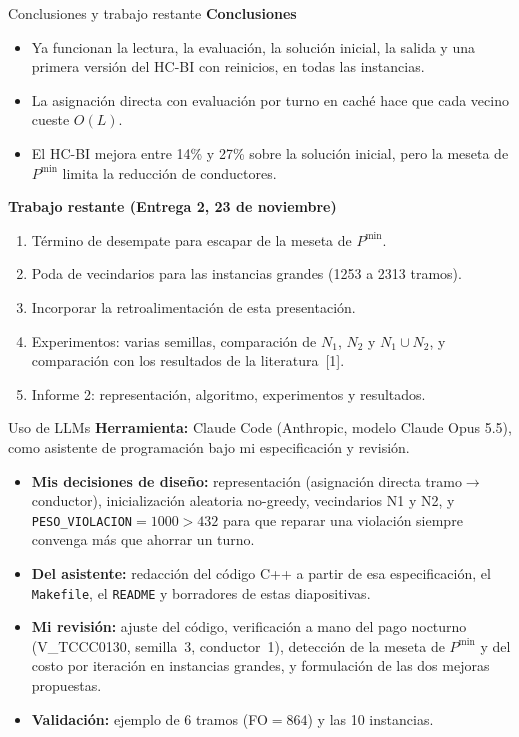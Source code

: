 \documentclass[aspectratio=169,10pt]{beamer}
\begin{document}
\begin{frame}{Conclusiones y trabajo restante}
\textbf{Conclusiones}
\begin{itemize}
\item Ya funcionan la lectura, la evaluación, la solución inicial, la salida y una primera versión del HC-BI con reinicios, en todas las instancias.
\item La asignación directa con evaluación por turno en caché hace que cada vecino cueste $O(L)$.
\item El HC-BI mejora entre 14\% y 27\% sobre la solución inicial, pero la meseta de $P^{\min}$ limita la reducción de conductores.
\end{itemize}
\textbf{Trabajo restante (Entrega 2, 23 de noviembre)}
\begin{enumerate}
\item Término de desempate para escapar de la meseta de $P^{\min}$.
\item Poda de vecindarios para las instancias grandes (1253 a 2313 tramos).
\item Incorporar la retroalimentación de esta presentación.
\item Experimentos: varias semillas, comparación de $N_1$, $N_2$ y $N_1\cup N_2$, y comparación con los resultados de la literatura~[1].
\item Informe 2: representación, algoritmo, experimentos y resultados.
\end{enumerate}
\end{frame}

\begin{frame}[fragile]{Uso de LLMs}
\small
\textbf{Herramienta:} Claude Code (Anthropic, modelo Claude Opus 5.5), como asistente de
programación bajo mi especificación y revisión.

\begin{itemize}
\item \textbf{Mis decisiones de diseño:} representación (asignación directa
      tramo$\to$conductor), inicialización aleatoria no-greedy, vecindarios N1 y N2,
      y \texttt{PESO\_VIOLACION}$=1000>432$ para que reparar una violación siempre
      convenga más que ahorrar un turno.
\item \textbf{Del asistente:} redacción del código C++ a partir de esa especificación,
      el \texttt{Makefile}, el \texttt{README} y borradores de estas diapositivas.
\item \textbf{Mi revisión:} ajuste del código, verificación a mano del pago nocturno
      (V\_TCCC0130, semilla~3, conductor~1), detección de la meseta de $P^{\min}$ y del
      costo por iteración en instancias grandes, y formulación de las dos mejoras
      propuestas.
\item \textbf{Validación:} ejemplo de 6 tramos (FO$=864$) y las 10 instancias.
\end{itemize}
\end{frame}
\end{document}
